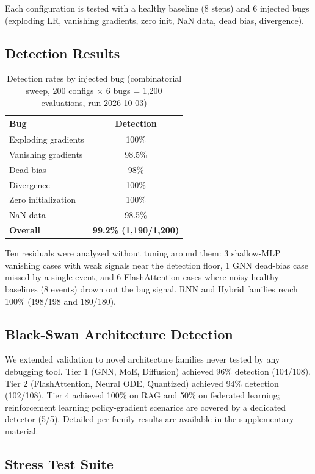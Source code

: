 \documentclass[11pt]{article}
\begin{document}
Each configuration is tested with a healthy baseline (8 steps) and 6 injected bugs (exploding LR, vanishing gradients, zero init, NaN data, dead bias, divergence).

\subsection{Detection Results}

\begin{table}[h]
\centering
\caption{Detection rates by injected bug (combinatorial sweep, 200 configs $\times$ 6 bugs = 1,200 evaluations, run 2026-10-03)}
\begin{tabular}{lc}
\toprule
\textbf{Bug} & \textbf{Detection} \\
\midrule
Exploding gradients & 100\% \\
Vanishing gradients & 98.5\% \\
Dead bias & 98\% \\
Divergence & 100\% \\
Zero initialization & 100\% \\
NaN data & 98.5\% \\
\midrule
\textbf{Overall} & \textbf{99.2\% (1,190/1,200)} \\
\bottomrule
\end{tabular}
\end{table}

Ten residuals were analyzed without tuning around them: 3 shallow-MLP vanishing cases with weak signals near the detection floor, 1 GNN dead-bias case missed by a single event, and 6 FlashAttention cases where noisy healthy baselines (8 events) drown out the bug signal. RNN and Hybrid families reach 100\% (198/198 and 180/180).

\subsection{Black-Swan Architecture Detection}

We extended validation to novel architecture families never tested by any debugging tool. Tier 1 (GNN, MoE, Diffusion) achieved 96\% detection (104/108). Tier 2 (FlashAttention, Neural ODE, Quantized) achieved 94\% detection (102/108). Tier 4 achieved 100\% on RAG and 50\% on federated learning; reinforcement learning policy-gradient scenarios are covered by a dedicated detector (5/5). Detailed per-family results are available in the supplementary material.

\subsection{Stress Test Suite}
\end{document}
